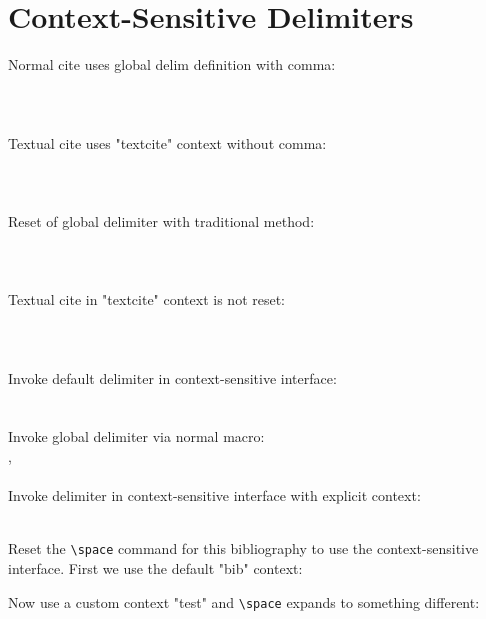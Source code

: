 \documentclass[a4paper]{article}
\newcommand{\cmd}[1]{\texttt{\textbackslash #1}}
\begin{document}
\section*{Context-Sensitive Delimiters}

Normal cite uses global delim definition with comma:\\\\
\cite{averroes/hannes}\\\\
Textual cite uses "textcite" context without comma:\\\\
\textcite{averroes/hannes}\\\\
Reset of global delimiter with traditional method:\\\\
\renewcommand*{\nametitledelim}{\addcomma\space}
\cite{averroes/hannes}\\\\
Textual cite in "textcite" context is not reset:\\\\
\textcite{averroes/hannes}\\\\
\begingroup
\def\addcomma{,}
\let\space\textvisiblespace
Invoke default delimiter in context-sensitive interface:\\
\\\\
Invoke global delimiter via normal macro:\\
\nametitledelim\\\\
Invoke delimiter in context-sensitive interface with explicit context:\\\\
\endgroup

\printbibliography

Reset the \cmd{space} command for this bibliography to use the
context-sensitive interface. First we use the default "bib" context:
\printbibliography

Now use a custom context "test" and \cmd{space} expands to something different:
\printbibliography
\end{document}
